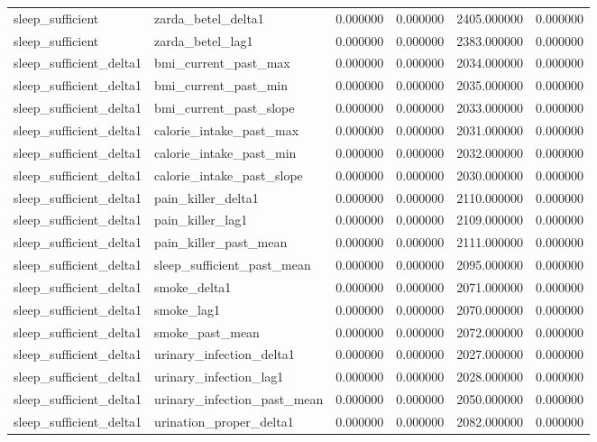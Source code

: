 \begin{longtable}{llrrrr}
sleep\_sufficient & zarda\_betel\_delta1 & 0.000000 & 0.000000 & 2405.000000 & 0.000000 \\
sleep\_sufficient & zarda\_betel\_lag1 & 0.000000 & 0.000000 & 2383.000000 & 0.000000 \\
sleep\_sufficient\_delta1 & bmi\_current\_past\_max & 0.000000 & 0.000000 & 2034.000000 & 0.000000 \\
sleep\_sufficient\_delta1 & bmi\_current\_past\_min & 0.000000 & 0.000000 & 2035.000000 & 0.000000 \\
sleep\_sufficient\_delta1 & bmi\_current\_past\_slope & 0.000000 & 0.000000 & 2033.000000 & 0.000000 \\
sleep\_sufficient\_delta1 & calorie\_intake\_past\_max & 0.000000 & 0.000000 & 2031.000000 & 0.000000 \\
sleep\_sufficient\_delta1 & calorie\_intake\_past\_min & 0.000000 & 0.000000 & 2032.000000 & 0.000000 \\
sleep\_sufficient\_delta1 & calorie\_intake\_past\_slope & 0.000000 & 0.000000 & 2030.000000 & 0.000000 \\
sleep\_sufficient\_delta1 & pain\_killer\_delta1 & 0.000000 & 0.000000 & 2110.000000 & 0.000000 \\
sleep\_sufficient\_delta1 & pain\_killer\_lag1 & 0.000000 & 0.000000 & 2109.000000 & 0.000000 \\
sleep\_sufficient\_delta1 & pain\_killer\_past\_mean & 0.000000 & 0.000000 & 2111.000000 & 0.000000 \\
sleep\_sufficient\_delta1 & sleep\_sufficient\_past\_mean & 0.000000 & 0.000000 & 2095.000000 & 0.000000 \\
sleep\_sufficient\_delta1 & smoke\_delta1 & 0.000000 & 0.000000 & 2071.000000 & 0.000000 \\
sleep\_sufficient\_delta1 & smoke\_lag1 & 0.000000 & 0.000000 & 2070.000000 & 0.000000 \\
sleep\_sufficient\_delta1 & smoke\_past\_mean & 0.000000 & 0.000000 & 2072.000000 & 0.000000 \\
sleep\_sufficient\_delta1 & urinary\_infection\_delta1 & 0.000000 & 0.000000 & 2027.000000 & 0.000000 \\
sleep\_sufficient\_delta1 & urinary\_infection\_lag1 & 0.000000 & 0.000000 & 2028.000000 & 0.000000 \\
sleep\_sufficient\_delta1 & urinary\_infection\_past\_mean & 0.000000 & 0.000000 & 2050.000000 & 0.000000 \\
sleep\_sufficient\_delta1 & urination\_proper\_delta1 & 0.000000 & 0.000000 & 2082.000000 & 0.000000 \\

\end{longtable}
